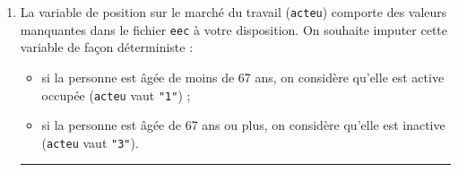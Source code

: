 \documentclass[12pt,twosided, notitlepage]{book}
\newenvironment{Shaded}{}{}
\newcommand{\CommentTok}[1]{\textcolor[rgb]{0.00,0.50,0.00}{#1}}
\newcommand{\DataTypeTok}[1]{#1}
\newcommand{\DecValTok}[1]{#1}
\newcommand{\KeywordTok}[1]{\textcolor[rgb]{0.00,0.00,1.00}{#1}}
\newcommand{\NormalTok}[1]{#1}
\newcommand{\OperatorTok}[1]{#1}
\newcommand{\StringTok}[1]{\textcolor[rgb]{0.00,0.50,0.50}{#1}}
\providecommand{\tightlist}{%
  \setlength{\itemsep}{0pt}\setlength{\parskip}{0pt}}
\newif \ifsol
\renewenvironment{Shaded}{\begin{snugshade}}{\end{snugshade}}
\begin{document}
\begin{enumerate}
\begin{enumerate}
    \ifsol 
     \begin{center} \rule{0.5\linewidth}{\linethickness}\end{center}

\begin{Shaded}
\begin{Highlighting}[]

\CommentTok{# La fonction substr() permet de sélectionner}
\CommentTok{# des caractères dans une chaîne}
\KeywordTok{substr}\NormalTok{(}\KeywordTok{c}\NormalTok{(}\StringTok{"abcd"}\NormalTok{, }\StringTok{"efgh"}\NormalTok{, }\StringTok{"ijkl"}\NormalTok{), }\DataTypeTok{start =} \DecValTok{2}\NormalTok{, }\DataTypeTok{stop =} \DecValTok{3}\NormalTok{)}
\NormalTok{  ## [1] "bc" "fg" "jk"}

\CommentTok{# Application à l'EEC}
\NormalTok{eec}\OperatorTok{$}\NormalTok{cs2 <-}\StringTok{ }\KeywordTok{substr}\NormalTok{(eec}\OperatorTok{$}\NormalTok{cse, }\DataTypeTok{start =} \DecValTok{1}\NormalTok{, }\DataTypeTok{stop =} \DecValTok{1}\NormalTok{)}

\CommentTok{# On vérifie qu'on obtient bien la même chose par les deux méthodes}
\KeywordTok{identical}\NormalTok{(eec}\OperatorTok{$}\NormalTok{cs, eec}\OperatorTok{$}\NormalTok{cs2)}
\NormalTok{  ## [1] TRUE}
\end{Highlighting}
\end{Shaded}

    \begin{center} \rule{0.5\linewidth}{\linethickness}\end{center} 
     \bigskip 
     \fi
  \end{enumerate}
\item
  La variable de position sur le marché du travail (\texttt{acteu})
  comporte des valeurs manquantes dans le fichier \texttt{eec} à votre
  disposition. On souhaite imputer cette variable de façon déterministe
  :

  \begin{itemize}
  \tightlist
  \item
    si la personne est âgée de moins de 67 ans, on considère qu'elle est
    active occupée (\texttt{acteu} vaut \texttt{"1"}) ;
  \item
    si la personne est âgée de 67 ans ou plus, on considère qu'elle est
    inactive (\texttt{acteu} vaut \texttt{"3"}).
  \end{itemize}

  \begin{center}\rule{0.5\linewidth}{\linethickness}\end{center}


\end{enumerate}
\end{document}
